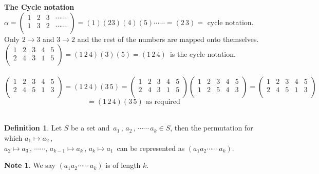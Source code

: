 \documentclass[11pt,a4paper]{article}
\theoremstyle{definition}
\newtheorem{defn}[thm]{Definition}
\newtheorem*{note}{Note}
\begin{document}
\textbf{The Cycle notation}\\
$\alpha = \begin{pmatrix}
1 & 2 & 3 & \cdots\cdots\\
1 & 3 & 2 & \cdots\cdots\\
\end{pmatrix} = (1) (23) (4)(5)\cdots\cdots = (2\, 3)= $ cycle notation.\\

Only $2\rightarrow 3$ and $3\rightarrow 2$ and the rest of the numbers are mapped onto themselves.\\

$\begin{pmatrix}
1 & 2 & 3 &  4 & 5\\
2 & 4 & 3 &  1 & 5\\
\end{pmatrix} = (1\,2\,4)(3)(5) = (1\,2\,4)\,$ is the cycle notation.\\\\




$\begin{pmatrix}
1 & 2 & 3 & 4 & 5\\
2 & 4 & 5 & 1 & 3\\
\end{pmatrix} = (1\, 2\, 4)(3\,5)= \begin{pmatrix}
1 & 2 & 3 & 4 & 5\\
2 & 4 & 3 & 1 & 5\\
\end{pmatrix}\begin{pmatrix}
1 & 2 & 3 & 4 & 5\\
1 & 2 & 5 & 4 & 3\\
\end{pmatrix} = \begin{pmatrix}
1 & 2 & 3 & 4 & 5\\
2 & 4 & 5 & 1 & 3\\
\end{pmatrix}$
$$=(1\, 2\, 4)(3\, 5)\,\, \text{as required}$$\\




\begin{defn}
Let $S$ be a set and $\, a_1\, ,\, a_2\,,\,\cdots\cdots\, a_k \in S$, then the permutation for which $a_1\longmapsto a_2\,,$\\ $a_2\longmapsto a_3\, , \, \cdots\cdots,\, a_{k -1} \longmapsto a_k\, ,\, a_k \longmapsto a_1\,$ can be represented as $(a_1a_2\cdots\cdots\, a_k)$.\\


\begin{note}
We say $(a_1a_2\cdots\cdots\, a_k)$  is of length $k$.\\
\end{note}
\end{defn}
\end{document}
